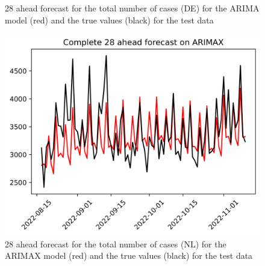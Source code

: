 \begin{figure}
\begin{minipage}{.32\textwidth}
  \caption{28 ahead forecast for the total number of cases (DE) for the ARIMA model (red) and the true values (black) for the test data}
  \label{fig:tot_cases_fc_28_ARIMA_DE}
\end{minipage}
\begin{minipage}{.32\textwidth}
  \centering
  \includegraphics[width=\linewidth]{pics/28_ah/Complete_28_ahead_ARIMAX.png}
  \caption{28 ahead forecast for the total number of cases (NL) for the ARIMAX model (red) and the true values (black) for the test data}
  \label{fig:tot_cases_fc_28_ARIMAX}
\end{minipage}

\end{figure}
